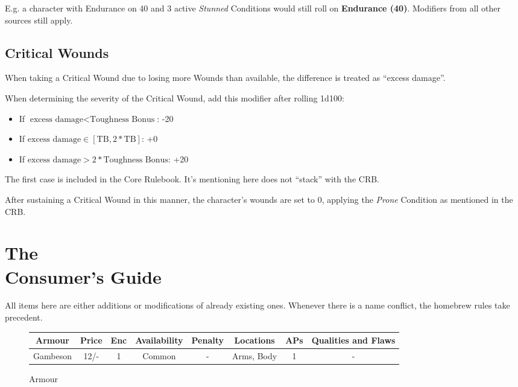 \documentclass[parskip=full,11pt]{wfrp-short}
\begin{document}
E.g. a character with Endurance on 40 and 3 active \textit{Stunned} Conditions
would still roll on \textbf{Endurance (40)}.
Modifiers from all other sources still apply.

\subsection{Critical Wounds}
When taking a Critical Wound due to losing more Wounds than available, the
difference is treated as \enquote{excess damage}.

When determining the severity of the Critical Wound, add this modifier after
rolling 1d100:
\begin{itemize}
    \item If $\text{excess damage} < \text{Toughness Bonus}$: -20
    \item If $\text{excess damage} \in [\text{TB}, 2*\text{TB}]$: +0
    \item If $\text{excess damage} > 2* \text{Toughness Bonus}$: +20
\end{itemize}

The first case is included in the Core Rulebook.
It's mentioning here does not \enquote{stack} with the CRB.

After sustaining a Critical Wound in this manner, the character's wounds are
set to 0, applying the \textit{Prone} Condition as mentioned in the CRB.

\section{The\\Consumer's Guide}

All items here are either additions or modifications of already existing ones.
Whenever there is a name conflict, the homebrew rules take precedent.

\begin{figure*}[b]
    \begin{tcolorbox}[standard jigsaw, colback=yellow!5!orange, opacityback=.25, boxrule=0pt]
    \caption{Armour}
    \centering
    \begin{tabu}{c|c|c|c|c|c|c|c}
        \rowfont{\bfseries} Armour & Price & Enc & Availability &
            Penalty & Locations & APs & Qualities and Flaws\\
        \hline
        Gambeson & 12/- & 1 & Common & - & Arms, Body & 1 & -\\
    \end{tabu}
    \end{tcolorbox}
\end{figure*}
\end{document}
